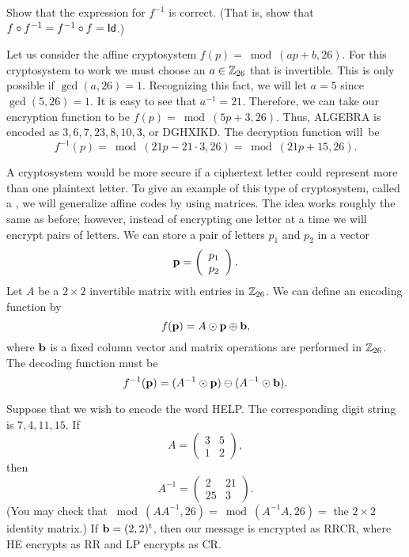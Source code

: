 \medskip
 
\begin{exercise}\label{exercise::}
 Show that the expression for $f^{-1}$ is correct.  (That is, show that $f \circ f^{-1}= f^{-1}\circ  f =  \sf{Id}$.)
\end{exercise}

\begin{example}
Let us consider the affine cryptosystem $f(p) = \bmod(ap + b, 26)$. For
this cryptosystem to work we must choose an $a \in {\Bbb Z}_{26}$
that is invertible. This is only possible if $\gcd(a, 26) = 1$.
Recognizing this fact, we will let $a = 5$ since $\gcd(5, 26) = 1$. It
is easy to see that $a^{-1} = 21$. Therefore, we can take our
encryption function to be $f(p) = \bmod(5p + 3,26) $. Thus, ALGEBRA is
encoded as $3, 6, 7, 23, 8, 10, 3$, or DGHXIKD. The decryption
function will~be   
$$
f^{-1}(p) = \bmod(21 p - 21 \cdot 3, 26)  = \bmod(21 p + 15, 26).
$$
\end{example}
 
 
\medskip
 
 
A cryptosystem would be more secure if a ciphertext letter could
represent more than one plaintext letter.  To give an example of this
type of cryptosystem, called a , we will generalize
affine codes by using matrices. The idea works roughly the same as
before; however, instead of encrypting one letter at a time we will
encrypt pairs of letters.  We can store a pair of letters $p_1$ and
$p_2$ in a vector  
$$
{\bold p} = 
\left(
\begin{array}{c}
p_1 \\ p_2
\end{array}
\right).
$$
Let $A$ be a $2 \times 2$ invertible matrix
with entries in ${\Bbb Z}_{26}$. We can define an encoding function by
$$
f({\bold p}) = A \odot {\bold p} \oplus {\bold b} ,
$$
where ${\bold b}$ is a fixed column vector and matrix operations are
performed in ${\Bbb Z}_{26}$. The decoding function must be
$$
f^{-1}({\bold p}) = (A^{-1} \odot {\bold p}) \ominus (A^{-1} \odot {\bold b}).
$$
 
 
\medskip
 
 
\begin{example}
Suppose that we wish to encode the word HELP. The corresponding
digit string is $7, 4, 11, 15$. If
$$
A =
\left(
\begin{array}{cc}
3 & 5 \\
1 & 2
\end{array}
\right),
$$
then
$$
A^{-1} 
=
\left(
\begin{array}{cc}
2 & 21 \\
25 & 3
\end{array}
\right).
$$
(You may check that $\bmod(AA^{-1},26) = \bmod(A^{-1}A,26) = $ the $2 \times 2$ identity matrix.)
If ${\bold b} = ( 2, 2)^{\rm t}$, then our message is encrypted as
RRCR, where HE encrypts as RR and LP encrypts as CR.
\end{example} 
 

